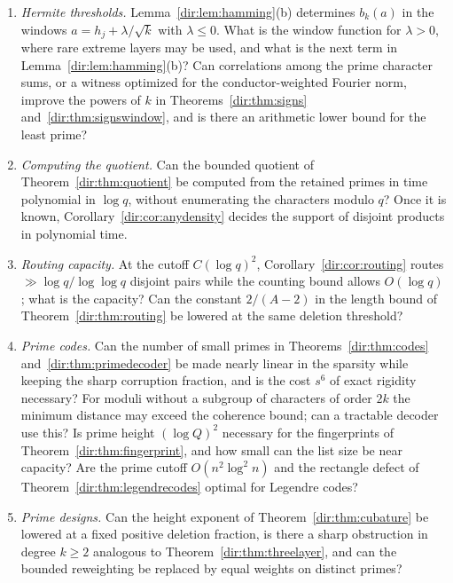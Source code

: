 \begin{enumerate}
 error $Q^{-A}$ and a fixed deletion fraction or retained density, what is the best leading constant
 in the logarithmic quota of Theorems~\ref{dir:thm:factorization}, \ref{dir:thm:minority}
 and~\ref{dir:thm:disjoint-growing}, also for growing $r$? Can the largest prime be made smaller than
 $K\log^2Q$ for a fixed number of factors while keeping the pointwise bound?
\item \emph{Hermite thresholds.} Lemma~\ref{dir:lem:hamming}(b) determines $b_k(a)$ in the windows
 $a=h_j+\lambda/\sqrt k$ with $\lambda\le0$. What is the window function for $\lambda>0$, where rare
 extreme layers may be used, and what is the next term in Lemma~\ref{dir:lem:hamming}(b)? Can
 correlations among the prime character sums, or a witness optimized for the conductor-weighted
 Fourier norm, improve the powers of $k$ in Theorems~\ref{dir:thm:signs}
 and~\ref{dir:thm:signswindow}, and is there an arithmetic lower bound for the least prime?
\item \emph{Computing the quotient.} Can the bounded quotient of Theorem~\ref{dir:thm:quotient}
 be computed from the retained primes in time polynomial in $\log q$, without enumerating the
 characters modulo $q$? Once it is known, Corollary~\ref{dir:cor:anydensity} decides the support of
 disjoint products in polynomial time.
\item \emph{Routing capacity.} At the cutoff $C(\log q)^2$, Corollary~\ref{dir:cor:routing} routes
 $\gg\log q/\log\log q$ disjoint pairs while the counting bound allows $O(\log q)$; what is the
 capacity? Can the constant $2/(A-2)$ in the length bound of Theorem~\ref{dir:thm:routing} be lowered
 at the same deletion threshold?
\item \emph{Prime codes.} Can the number of small primes in Theorems~\ref{dir:thm:codes}
 and~\ref{dir:thm:primedecoder} be made nearly linear in the sparsity while keeping the sharp
 corruption fraction, and is the cost $s^6$ of exact rigidity necessary? For moduli without a
 subgroup of characters of order $2k$ the minimum distance may exceed the coherence bound; can a
 tractable decoder use this? Is prime height $(\log Q)^2$ necessary for the fingerprints of
 Theorem~\ref{dir:thm:fingerprint}, and how small can the list size be near capacity? Are the prime
 cutoff $O(n^2\log^2n)$ and the rectangle defect of Theorem~\ref{dir:thm:legendrecodes} optimal for
 Legendre codes?
\item \emph{Prime designs.} Can the height exponent of Theorem~\ref{dir:thm:cubature} be lowered at a fixed
 positive deletion fraction, is there a sharp obstruction in degree $k\ge2$ analogous to
 Theorem~\ref{dir:thm:threelayer}, and can the bounded reweighting be replaced by equal weights on distinct
 primes?
\end{enumerate}
